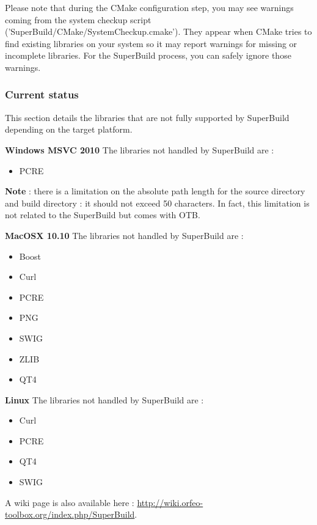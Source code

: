 Please note that during the CMake configuration step, you may see warnings coming from the system checkup script ('SuperBuild/CMake/SystemCheckup.cmake'). They appear when CMake tries to find existing libraries on your system so it may report warnings for missing or incomplete libraries. For the SuperBuild process, you can safely ignore those warnings.

\subsubsection{Current status}

This section details the libraries that are not fully supported by SuperBuild depending on the target platform. 

\textbf{Windows MSVC 2010}
\newline
The libraries not handled by SuperBuild are : 
\begin{itemize}
	\item PCRE
\end{itemize}

\textbf{Note} : there is a limitation on the absolute path length for the source directory and build directory : it should not exceed 50 characters. In fact, this limitation is not related to the SuperBuild but comes with OTB.

\textbf{MacOSX 10.10}
\newline
The libraries not handled by SuperBuild are : 
\begin{itemize}
	\item Boost
	\item Curl
	\item PCRE
	\item PNG
	\item SWIG
	\item ZLIB
	\item QT4
\end{itemize}

\textbf{Linux}
\newline
The libraries not handled by SuperBuild are : 
\begin{itemize}
	\item Curl
	\item PCRE
	\item QT4
	\item SWIG
\end{itemize}

A wiki page is also available here : \url{http://wiki.orfeo-toolbox.org/index.php/SuperBuild}.


